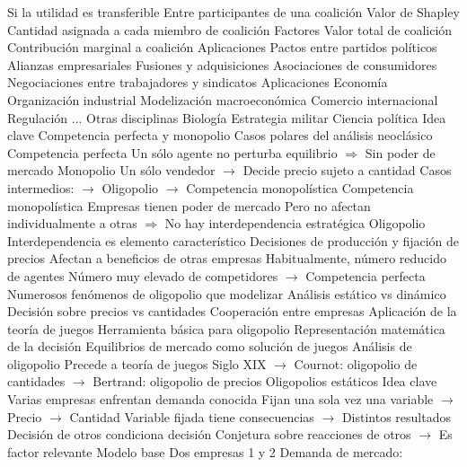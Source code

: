 \documentclass{nuevotema}
\begin{document}
\begin{esquemal}
				\4 Si la utilidad es transferible
				\4[] Entre participantes de una coalición
				\4 Valor de Shapley
				\4[] Cantidad asignada a cada miembro de coalición
				\4 Factores
				\4[] Valor total de coalición
				\4[] Contribución marginal a coalición
			\3 Aplicaciones
				\4 Pactos entre partidos políticos
				\4 Alianzas empresariales
				\4 Fusiones y adquisiciones
				\4 Asociaciones de consumidores
				\4 Negociaciones entre trabajadores y sindicatos
		\2 Aplicaciones
			\3 Economía
				\4 Organización industrial
				\4 Modelización macroeconómica
				\4 Comercio internacional
				\4 Regulación
				\4[] ...
			\3 Otras disciplinas
				\4 Biología
				\4 Estrategia militar
				\4 Ciencia política
	\1 \marcar{Oligopolio}
		\2 Idea clave
			\3 Competencia perfecta y monopolio
				\4 Casos polares del análisis neoclásico
				\4 Competencia perfecta
				\4[] Un sólo agente no perturba equilibrio
				\4[] $\Rightarrow$ Sin poder de mercado
				\4 Monopolio
				\4[] Un sólo vendedor
				\4[] $\to$ Decide precio sujeto a cantidad
				\4 Casos intermedios:
				\4[] $\to$ Oligopolio
				\4[] $\to$ Competencia monopolística
				\4 Competencia monopolística
				\4[] Empresas tienen poder de mercado
				\4[] Pero no afectan individualmente a otras
				\4[] $\Rightarrow$ No hay interdependencia estratégica
			\3 Oligopolio
				\4 Interdependencia es elemento característico
				\4 Decisiones de producción y fijación de precios
				\4[] Afectan a beneficios de otras empresas
				\4 Habitualmente, número reducido de agentes
				\4[] Número muy elevado de competidores
				\4[] $\to$ Competencia perfecta
				\4 Numerosos fenómenos de oligopolio que modelizar
				\4[] Análisis estático vs dinámico
				\4[] Decisión sobre precios vs cantidades
				\4[] Cooperación entre empresas
			\3 Aplicación de la teoría de juegos
				\4 Herramienta básica para oligopolio
				\4 Representación matemática de la decisión
				\4 Equilibrios de mercado como solución de juegos
				\4 Análisis de oligopolio
				\4[] Precede a teoría de juegos
				\4[] Siglo XIX
				\4[] $\to$ Cournot: oligopolio de cantidades
				\4[] $\to$ Bertrand: oligopolio de precios
		\2 Oligopolios estáticos
			\3 Idea clave
				\4 Varias empresas enfrentan demanda conocida
				\4 Fijan una sola vez una variable
				\4[] $\to$ Precio
				\4[] $\to$ Cantidad
				\4[] Variable fijada tiene consecuencias
				\4[] $\to$ Distintos resultados
				\4 Decisión de otros condiciona decisión
				\4 Conjetura sobre reacciones de otros
				\4[] $\to$ Es factor relevante
			\3 Modelo base
				\4 Dos empresas 1 y 2
				\4 Demanda de mercado:

\end{esquemal}
\end{document}
